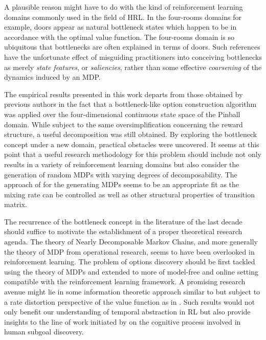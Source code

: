 \documentclass[12pt, oneside, extrafontsizes]{memoir}  %
\theoremstyle{plain}
\theoremstyle{definition}
\begin{document}
A plausible reason might have to do with the kind of reinforcement learning domains commonly used in the field of HRL. In the four-rooms domains for example, doors appear as natural bottleneck states which happen to be in accordance with the optimal value function. The four-rooms domain is so ubiquitous that bottlenecks are often explained in terms of doors. Such references have the unfortunate effect of misguiding practitioners into conceiving bottlenecks as merely \textit{state features}, or \textit{saliencies}, rather than some effective \textit{coarsening} of the dynamics induced by an MDP.

The empirical results presented in this work departs from those obtained by previous authors in the fact that a bottleneck-like option construction algorithm was applied over the four-dimensional continuous state space of the Pinball domain. While subject to the same oversimplification concerning the reward structure, a useful decomposition was still obtained. By exploring the bottleneck concept under a new domain, practical obstacles were uncovered. 
It seems at this point that a useful research methodology for this problem should include not only results in a variety of reinforcement learning domains but also consider the generation of random MDPs with varying degrees of decomposability. The approach of \cite{Archibald1995} for the generating MDPs seems to be an appropriate fit as the mixing rate can be controlled as well as other structural properties of transition matrix. 

The recurrence of the bottleneck concept in the literature of the last decade should suffice to motivate the establishment of a proper theoretical research agenda.  The theory of Nearly Decomposable Markov Chains, and more generally the theory of MDP from operational research, seems to have been overlooked in reinforcement learning. The problem of options discovery should be first tackled using the theory of MDPs and extended to more of model-free and online setting compatible with the reinforcement learning framework. A promising research avenue might lie in some information theoretic approach similar to \cite{Deng2011} but subject to a rate distortion perspective of the value function as in \cite{Still2012}. Such results would not only benefit our understanding of temporal abstraction in RL but also provide insights to the line of work initiated by \cite{Bovinick2012} on the cognitive process involved in human subgoal discovery.





\end{document}
